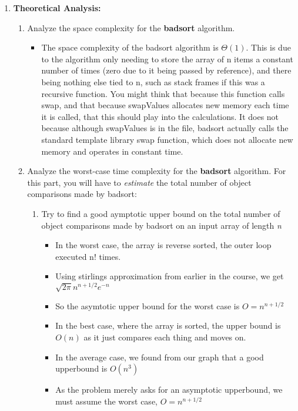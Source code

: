 \begin{enumerate}
\begin{enumerate}
\begin{itemize}
    \end{itemize}
  \end{enumerate}
\item \textbf{Theoretical Analysis:}
  \begin{enumerate}
  \item Analyze the space complexity for the \textbf{badsort} algorithm.
    \begin{itemize}
    \item The space complexity of the badsort algorithm is $\Theta(1)$. This is due to the algorithm only needing to store the array of n items a constant number of times (zero due to it being passed by reference), and there being nothing else tied to n, such as stack frames if this was a recursive function. You might think that because this function calls swap, and that because swapValues allocates new memory each time it is called, that this should play into the calculations. It does not because although swapValues is in the file, badsort actually calls the standard template library swap function, which does not allocate new memory and operates in constant time.
    \end{itemize}
  \item Analyze the worst-case time complexity for the \textbf{badsort} algorithm. For this part, you will have to \emph{estimate} the total number of object comparisons made by badsort:
    \begin{enumerate}
    \item Try to find a good aymptotic upper bound on the total number of object comparisons made by badsort on an input array of length \emph{n}
      \begin{itemize}
      \item In the worst case, the array is reverse sorted, the outer loop executed n! times.
      \item Using stirlings approximation from earlier in the course, we get $\sqrt{2\pi}n^{n+1/2}e^{-n}$
      \item So the asymtotic upper bound for the worst case is $O=n^{n+1/2}$
      \item In the best case, where the array is sorted, the upper bound is $O(n)$ as it just compares each thing and moves on.
      \item In the average case, we found from our graph that a good upperbound is $O(n^{3})$
      \item As the problem merely asks for an asymptotic upperbound, we must assume the worst case, $O=n^{n+1/2}$
      \end{itemize}

\end{enumerate}
\end{enumerate}
\end{enumerate}
